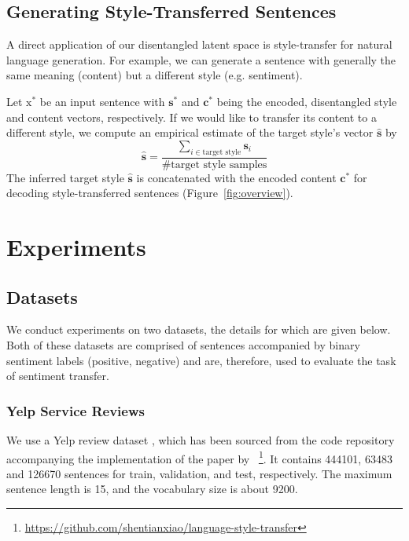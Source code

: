 \documentclass[letterpaper]{article} %
\newcommand{\rmx}{\mathrm x}
\newcommand{\citeay}[1]{\citeauthor{#1} \shortcite{#1}}
\begin{document}
\subsection{Generating Style-Transferred Sentences} \label{ssec:sentence-generation}

A direct application of our disentangled latent space is style-transfer for natural language generation.
For example, we can generate a sentence with generally the same meaning (content) but a different style (e.g. sentiment).

Let $\rmx^*$ be an input sentence with $\bm s^*$ and $\bm c^*$ being the encoded, disentangled style and content vectors, respectively.
If we would like to transfer its content to a different style, we compute an empirical estimate of the target style's vector $\hat{\bm s}$ by
\begin{equation*}
	\hat{\bm s}=\frac{\sum_{i\in\text{target style}}\bm s_i}{\text{\# target style samples}}
\end{equation*}
The inferred target style $\hat{\bm s}$ is concatenated with the encoded content $\bm c^*$ for decoding style-transferred sentences (Figure~\ref{fig:overview}).


\section{Experiments}


\subsection{Datasets}

We conduct experiments on two datasets, the details for which are given below.
Both of these datasets are comprised of sentences accompanied by binary sentiment labels (positive, negative) and are, therefore, used to evaluate the task of sentiment transfer.

\subsubsection{Yelp Service Reviews}

We use a Yelp review dataset \cite{challenge2013yelp}, which has been sourced from the code repository accompanying the implementation of the paper by \citeay{shen2017style}~\footnote{\url{https://github.com/shentianxiao/language-style-transfer}}.
It contains 444101, 63483 and 126670 sentences for train, validation, and test, respectively.
The maximum sentence length is 15, and the vocabulary size is about 9200.
\end{document}

